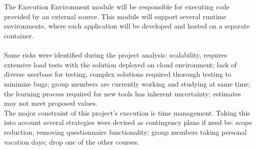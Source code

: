 \\
\fi
\\
The Execution Environment module will be responsible for executing code provided by an external source. This module will support several runtime environments, where each application will be developed and hosted on a separate container.
\\
\\
Some risks were identified during the project analysis: scalability, requires extensive load tests with the solution deployed on cloud environment; lack of diverse userbase for testing, complex solutions required thorough testing to minimize bugs; group members are currently working and studying at same time; the learning process required for new tools has inherent uncertainty; estimates may not meet proposed values.
\\
The major constraint of this project's execution is time management. Taking this into account several strategies were devised as contingency plans if need be: scope reduction, removing questionnaire functionality; group members taking personal vacation days; drop one of the other courses.